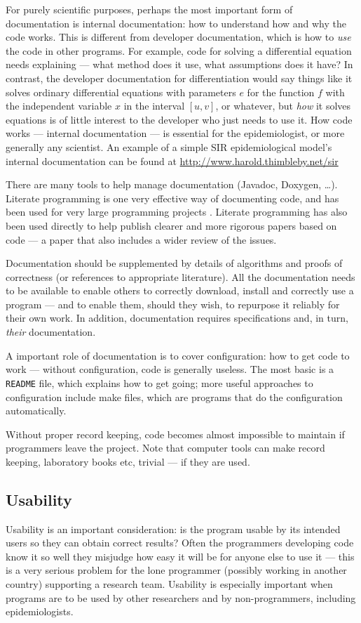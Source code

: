 \documentclass[10pt,a4paper]{article}
\begin{document}
For purely scientific purposes, perhaps the most important form of documentation is internal documentation: how to understand how and why the code works. This is different from developer documentation, which is how to \emph{use\/} the code in other programs. For example, code for solving a differential equation needs explaining --- what method does it use, what assumptions does it have? In contrast, the developer documentation for differentiation would say things like it solves ordinary differential equations with parameters $e$ for the function $f$ with the independent variable $x$ in the interval $[u,v]$, or whatever, but \emph{how\/} it solves equations is of little interest to the developer who just needs to use it. How code works --- internal documentation --- is essential for the epidemiologist, or more generally any scientist. An example of a simple SIR epidemiological model's internal documentation can be found at \url{http://www.harold.thimbleby.net/sir} 

There are many tools to help manage documentation (Javadoc, Doxygen, \ldots). Literate programming is one very effective way of documenting code, and has been used for very large programming projects \cite{LP}. Literate programming has also been used directly to help publish clearer and more rigorous papers based on code \cite{relit} --- a paper that also includes a wider review of the issues.

Documentation should be supplemented by details of algorithms and proofs of correctness (or references to appropriate literature). All the documentation needs to be available to enable others to correctly download, install and correctly use a program --- and to enable them, should they wish, to repurpose it reliably for their own work. In addition, documentation requires specifications and, in turn, \emph{their\/} documentation. 

A important role of documentation is to cover configuration: how to get code to work --- without configuration, code is generally useless. The most basic is a \texttt{README} file, which explains how to get going; more useful approaches to configuration include make files, which are programs that do the configuration automatically.

Without proper record keeping, code becomes almost impossible to maintain if programmers leave the project. Note that computer tools can make record keeping, laboratory books etc, trivial --- if they are used.

\subsection{Usability}
\label{supplement-material-makefiles}
Usability is an important consideration: \cite{hci1,hci2} is the program usable by its intended users so they can obtain correct results? Often the programmers developing code know it so well they misjudge how easy it will be for anyone else to use it --- this is a very serious problem for the lone programmer (possibly working in another country) supporting a research team. Usability is especially important when programs are to be used by other researchers and by non-programmers, including epidemiologists.
\end{document}
